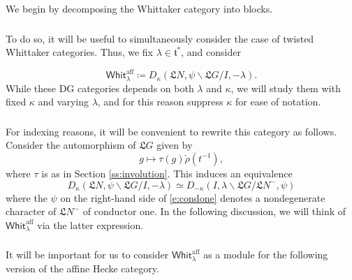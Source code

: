 \documentclass[11pt,reqno]{amsart}
\newcommand{\aff}{\operatorname{aff}}
\newcommand{\fL}{\mathfrak{L}}
\newcommand{\ft}{\mathfrak{t}}
\theoremstyle{remark}
\numberwithin{equation}{section}
\newcommand{\Whit}{\mathsf{Whit}}
\begin{document}
We begin by decomposing the Whittaker category into 
blocks.  

\subsubsection{}To do so, it will be useful to simultaneously consider the case 
of twisted Whittaker categories. Thus, we fix $\lambda \in \ft^*$, and 
consider

\[
\Whit_{\lambda}^{\aff} \coloneqq 
D_{\kappa}(\fL N,\psi \backslash \fL G / I,-\lambda).
\]
While these DG categories depends on both $\lambda$ and $\kappa$, we will study 
them with fixed $\kappa$ and varying $\lambda$, and for this reason suppress 
$\kappa$ for ease of notation. 


\subsubsection{}\label{sss:indexing}

For indexing reasons, it will be convenient to rewrite this category  
as follows. Consider the automorphism of $\fL G$ given by 
%
\[
g \mapsto \tau(g) \check{\rho}(t^{-1}),
\]
%
where $\tau$ is as in Section \ref{ss:involution}. This induces an equivalence
%
\begin{equation} \label{e:condone}
D_\kappa(\fL N, \psi \backslash \fL G / I,-\lambda) \simeq 
D_{-\kappa}(I,\lambda \backslash \fL 
G /\fL N^-, \psi)
\end{equation}
%
where the $\psi$ on the right-hand side of \eqref{e:condone} denotes a 
nondegenerate character of $\fL N^-$ of 
conductor one. In the 
following discussion, we will think of $\Whit_{\lambda}^{\aff}$
via the latter expression.

\subsubsection{} \label{sss:intweylgp}It will be important for us to consider 
$\Whit_{\lambda}^{\aff}$ as a module for the following version of the
affine Hecke category. 
\end{document}
